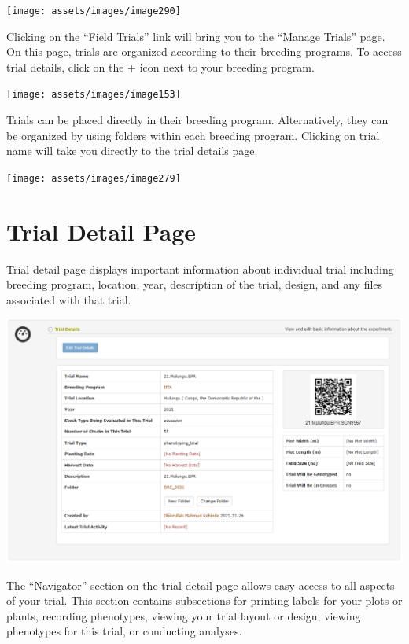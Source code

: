 \documentclass[
  12pt,
]{book}
\begin{document}
\begin{center}\texttt{[image: assets/images/image290]} \end{center}

Clicking on the ``Field Trials'' link will bring you to the ``Manage Trials'' page. On this page, trials are organized according to their breeding programs. To access trial details, click on the + icon next to your breeding program.

\begin{center}\texttt{[image: assets/images/image153]} \end{center}

Trials can be placed directly in their breeding program. Alternatively, they can be organized by using folders within each breeding program. Clicking on trial name will take you directly to the trial details page.

\begin{center}\texttt{[image: assets/images/image279]} \end{center}

\hypertarget{trial-detail-page}{%
\section{Trial Detail Page}\label{trial-detail-page}}

Trial detail page displays important information about individual trial including breeding program, location, year, description of the trial, design, and any files associated with that trial.

\begin{center}\includegraphics[width=0.95\linewidth]{assets/images/trial_detail_page_start} \end{center}

The ``Navigator'' section on the trial detail page allows easy access to all aspects of your trial. This section contains subsections for printing labels for your plots or plants, recording phenotypes, viewing your trial layout or design, viewing phenotypes for this trial, or conducting analyses.
\end{document}
